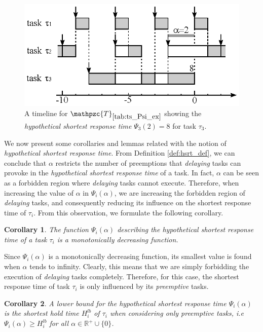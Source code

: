 \documentclass[fleqn]{article}
\newtheorem{corollary}{Corollary}
\begin{document}
\begin{figure}[H]
	\centering
	\includegraphics[width=0.55\linewidth]{figures/ex_psi_alpha}
	\caption{A timeline for $\mathpzc{T}_{\ref{tab:ts_Psi_ex}}$ showing the \textit{hypothetical shortest response time} $\Psi_3(2)=8$ for task $\tau_3$.}
	\label{fig:ex_Psi_alpha}
\end{figure}

We now present some corollaries and lemmas related with the notion of \textit{hypothetical shortest response time}. From Definition \ref{def:hsrt_def}, we can conclude that $\alpha$ restricts the number of preemptions that \textit{delaying} tasks can provoke in the \textit{hypothetical shortest response time} of a task. In fact, $\alpha$ can be seen as a forbidden region where \textit{delaying} tasks cannot execute. Therefore, when increasing the value of $\alpha$ in $\Psi_i(\alpha)$, we are increasing the forbidden region of \textit{delaying} tasks, and consequently reducing its influence on the shortest response time of $\tau_i$. From this observation, we formulate the following corollary.

\begin{corollary} \label{lm:monotonicity_Psi_alpha}
	The function $\Psi_i(\alpha)$ describing the \textit{hypothetical shortest response time} of a task $\tau_i$ is a monotonically decreasing function.
\end{corollary}

Since $\Psi_i(\alpha)$ is a monotonically decreasing function, its smallest value is found when $\alpha$ tends to infinity. Clearly, this means that we are simply forbidding the execution of \textit{delaying} tasks completely. Therefore, for this case, the shortest response time of task $\tau_i$ is only influenced by its \textit{preemptive} tasks.

\begin{corollary} \label{hrt_lb}
	A lower bound for the \textit{hypothetical shortest response time} $\Psi_i(\alpha)$ is the shortest hold time $H^{lb}_i$ of $\tau_i$ when considering only preemptive tasks, i.e $\Psi_i(\alpha) \geq H^{lb}_i$ for all $\alpha \in \mathbb{R^+} \cup \{0\}$.
\end{corollary}
\end{document}
